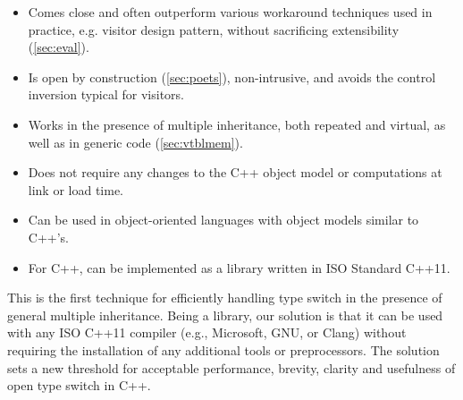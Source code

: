   \begin{itemize}
  \setlength{\itemsep}{0pt}
  \setlength{\parskip}{0pt}
  \item Comes close and often outperform various workaround techniques used in 
        practice, e.g. visitor design pattern, without sacrificing extensibility
        (\textsection\ref{sec:eval}). 
  \item Is open by construction (\textsection\ref{sec:poets}), non-intrusive, 
        and avoids the control inversion typical for visitors. 
  \item Works in the presence of multiple inheritance, both repeated and 
        virtual, as well as in generic code (\textsection\ref{sec:vtblmem}).
  \item Does not require any changes to the C++ object model or computations at 
        link or load time. 
  \item Can be used in object-oriented languages with 
        object models similar to C++'s.
  \item For C++, can be implemented as a library written in ISO Standard C++11.
  \end{itemize}

\noindent
This is the first technique for efficiently handling 
type switch in the presence of general multiple inheritance.
Being a library, our solution is that it can be used with any 
ISO C++11 compiler (e.g., Microsoft, GNU, or Clang) without requiring the installation of 
any additional tools or preprocessors. The solution
sets a new threshold for acceptable performance, brevity, clarity and
usefulness of open type switch in C++.

